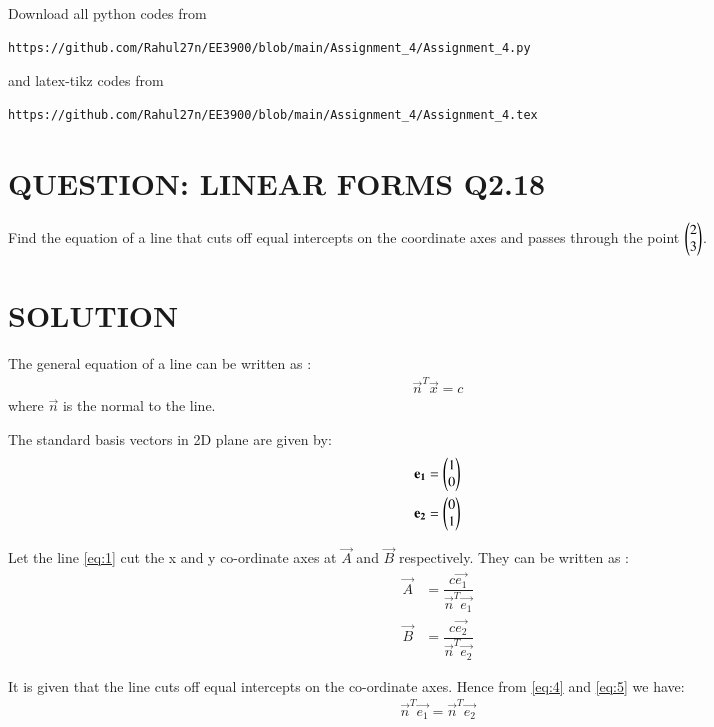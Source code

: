\documentclass[journal,12pt,twocolumn]{IEEEtran}
\begin{document}
\maketitle
\newpage
\bigskip
\renewcommand{\thefigure}{\theenumi}
\renewcommand{\thetable}{\theenumi}
Download all python codes from 
\begin{lstlisting}
https://github.com/Rahul27n/EE3900/blob/main/Assignment_4/Assignment_4.py
\end{lstlisting}
%
and latex-tikz codes from 
%
\begin{lstlisting}
https://github.com/Rahul27n/EE3900/blob/main/Assignment_4/Assignment_4.tex
\end{lstlisting}
\vspace{0.5cm}
\section{QUESTION: LINEAR FORMS Q2.18}
Find the equation of a line that cuts off equal intercepts on the coordinate axes and passes through the point $\begin{pmatrix}2 \\ 3\end{pmatrix}$.
\section{SOLUTION}
The general equation of a line can be written as :
\begin{align}
\vec{n}^T\vec{x}=c \label{eq:1}  
\end{align}
where $\vec{n}$ is the normal to the line.

The standard basis vectors in 2D plane are given by:
\begin{align}
\mathbf{e_{1}} &= \begin{pmatrix}1 \\ 0\end{pmatrix}\label{eq:2}
\\\mathbf{e_{2}} &= \begin{pmatrix}0 \\ 1\end{pmatrix}\label{eq:3}
\end{align}

Let the line \eqref{eq:1} cut the x and y co-ordinate axes at $\vec{A}$ and $\vec{B}$ respectively. They can be written as :
\begin{align}
\vec{A} &= \dfrac{c\vec{e_{1}}}{\vec{n}^T\vec{e_{1}}}\label{eq:4}\\
\vec{B} &= \dfrac{c\vec{e_{2}}}{\vec{n}^T\vec{e_{2}}}\label{eq:5}
\end{align}

It is given that the line cuts off equal intercepts on the co-ordinate axes. Hence from \eqref{eq:4} and \eqref{eq:5} we have:
\begin{align}
\vec{n}^T\vec{e_{1}} = \vec{n}^T\vec{e_{2}}
\end{align}
\end{document}
